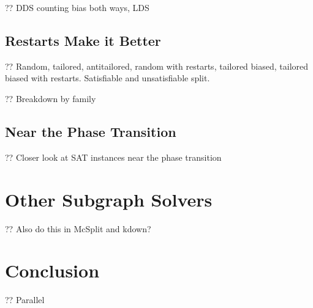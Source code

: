 \documentclass{article}
\begin{document}
?? DDS counting bias both ways, LDS

\subsection{Restarts Make it Better}

?? Random, tailored, antitailored, random with restarts, tailored biased, tailored biased with
restarts. Satisfiable and unsatisfiable split.

?? Breakdown by family

\subsection{Near the Phase Transition}

?? Closer look at SAT instances near the phase transition

\section{Other Subgraph Solvers}

?? Also do this in McSplit and kdown?

\section{Conclusion}

?? Parallel



\end{document}
